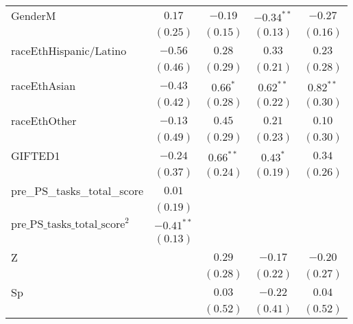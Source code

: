 \begin{center}
\begin{tabular}{l c c c c}
GenderM                                            & $0.17$        & $-0.19$     & $-0.34^{**}$ & $-0.27$      \\
                                                   & $(0.25)$      & $(0.15)$    & $(0.13)$     & $(0.16)$     \\
raceEthHispanic/Latino                             & $-0.56$       & $0.28$      & $0.33$       & $0.23$       \\
                                                   & $(0.46)$      & $(0.29)$    & $(0.21)$     & $(0.28)$     \\
raceEthAsian                                       & $-0.43$       & $0.66^{*}$  & $0.62^{**}$  & $0.82^{**}$  \\
                                                   & $(0.42)$      & $(0.28)$    & $(0.22)$     & $(0.30)$     \\
raceEthOther                                       & $-0.13$       & $0.45$      & $0.21$       & $0.10$       \\
                                                   & $(0.49)$      & $(0.29)$    & $(0.23)$     & $(0.30)$     \\
GIFTED1                                            & $-0.24$       & $0.66^{**}$ & $0.43^{*}$   & $0.34$       \\
                                                   & $(0.37)$      & $(0.24)$    & $(0.19)$     & $(0.26)$     \\
pre\_PS\_tasks\_total\_score & $0.01$        &             &              &              \\
                                                   & $(0.19)$      &             &              &              \\
$\text{pre\_PS\_tasks\_total\_score}^2$ & $-0.41^{**}$  &             &              &              \\
                                                   & $(0.13)$      &             &              &              \\
Z                                                  &               & $0.29$      & $-0.17$      & $-0.20$      \\
                                                   &               & $(0.28)$    & $(0.22)$     & $(0.27)$     \\
Sp                                                 &               & $0.03$      & $-0.22$      & $0.04$       \\
                                                   &               & $(0.52)$    & $(0.41)$     & $(0.52)$     \\

\end{tabular}
\end{center}
